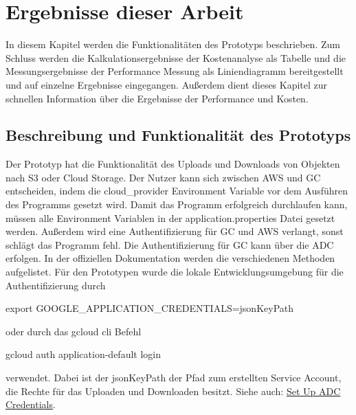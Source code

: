 \chapter{Ergebnisse dieser Arbeit}

In diesem Kapitel werden die Funktionalitäten des Prototyps beschrieben. Zum Schluss werden die Kalkulationsergebnisse der Kostenanalyse als Tabelle und die Messungsergebnisse der Performance Messung als Liniendiagramm bereitgestellt und auf einzelne Ergebnisse eingegangen. Außerdem dient dieses Kapitel zur schnellen Information über die Ergebnisse der Performance und Kosten. 

\section{Beschreibung und Funktionalität des Prototyps}

Der Prototyp hat die Funktionalität des Uploads und Downloads von Objekten nach S3 oder Cloud Storage. Der Nutzer kann sich zwischen AWS und GC entscheiden, indem die cloud\_provider Environment Variable vor dem Ausführen des Programms gesetzt wird. Damit das Programm erfolgreich durchlaufen kann, müssen alle Environment Variablen in der application.properties Datei gesetzt werden. Außerdem wird eine Authentifizierung für GC und AWS verlangt, sonst schlägt das Programm fehl. Die Authentifizierung für GC kann über die ADC erfolgen. In der offiziellen Dokumentation werden die verschiedenen Methoden aufgelistet. Für den Prototypen wurde die lokale Entwicklungsumgebung für die Authentifizierung durch 

	\begin{code}
		export GOOGLE\_APPLICATION\_CREDENTIALS=jsonKeyPath
	\end{code} 
	
	oder durch das gcloud cli Befehl 
	
	\begin{code}gcloud auth application-default login \end{code} 
	
	verwendet. Dabei ist der jsonKeyPath der Pfad zum erstellten Service Account, die Rechte für das Uploaden und Downloaden besitzt. Siehe auch: \href{https://cloud.google.com/docs/authentication/provide-credentials-adc}{Set Up ADC Credentials}.\\
	
